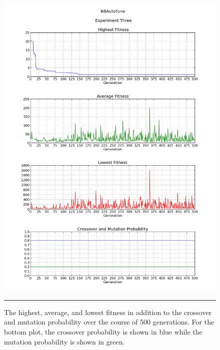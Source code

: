 \begin{figure}[htbp]
\centering
\includegraphics[width=5in]{../Figures/Chapter4/exp3_halcm.png}
\rule{35em}{0.5pt}
\caption[Experiment Three GA Metrics]{The highest, average, and lowest fitness in addition to the crossover and mutation probability over the course of 500 generations. For the bottom plot, the crossover probability is shown in blue while the mutation probability is shown in green.}
\label{fig:exp3_halcm}
\end{figure}

